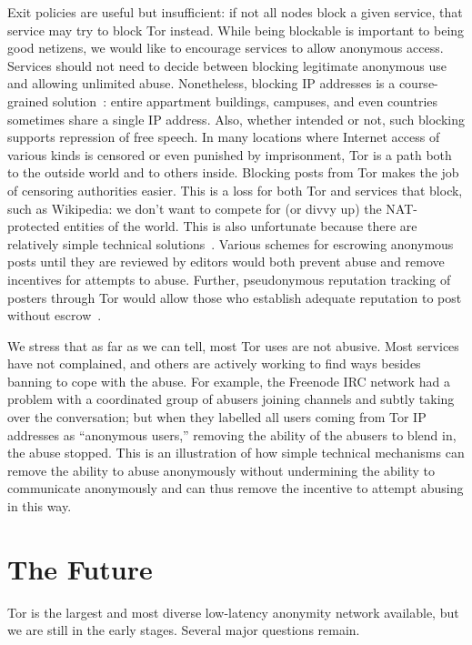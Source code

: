 \documentclass{llncs}
\begin{document}
Exit policies are useful but insufficient: if not all nodes block a
given service, that service may try to block Tor instead.  While being
blockable is important to being good netizens, we would like to
encourage services to allow anonymous access. Services should not need
to decide between blocking legitimate anonymous use and allowing
unlimited abuse.  Nonetheless, blocking IP addresses is a
course-grained solution~\cite{netauth}: entire appartment buildings,
campuses, and even countries sometimes share a single IP address.
Also, whether intended or not, such blocking supports repression of
free speech. In many locations where Internet access of various kinds
is censored or even punished by imprisonment, Tor is a path both to
the outside world and to others inside.  Blocking posts from Tor makes
the job of censoring authorities easier.  This is a loss for both Tor
and services that block, such as Wikipedia: we don't want to compete
for (or divvy up) the NAT-protected entities of the world.  This is
also unfortunate because there are relatively simple technical
solutions~\cite{nym}.  Various schemes for escrowing anonymous posts
until they are reviewed by editors would both prevent abuse and remove
incentives for attempts to abuse. Further, pseudonymous reputation
tracking of posters through Tor would allow those who establish
adequate reputation to post without escrow~\cite{nym,nymble}.

We stress that as far as we can tell, most Tor uses are not
abusive. Most services have not complained, and others are actively
working to find ways besides banning to cope with the abuse. For
example, the Freenode IRC network had a problem with a coordinated
group of abusers joining channels and subtly taking over the
conversation; but when they labelled all users coming from Tor IP
addresses as ``anonymous users,'' removing the ability of the abusers
to blend in, the abuse stopped.  This is an illustration of how simple
technical mechanisms can remove the ability to abuse anonymously
without undermining the ability to communicate anonymously and can
thus remove the incentive to attempt abusing in this way.



\section{The Future}
\label{sec:conclusion}

Tor is the largest and most diverse low-latency anonymity network
available, but we are still in the early stages. Several major
questions remain.
\end{document}
